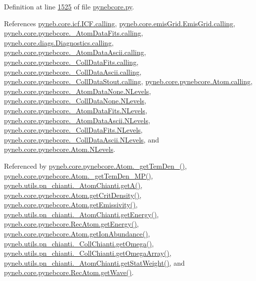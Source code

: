 Definition at line \hyperlink{pynebcore_8py_source_l01525}{1525} of file \hyperlink{pynebcore_8py_source}{pynebcore.\-py}.



References \hyperlink{icf_8py_source_l00016}{pyneb.\-core.\-icf.\-I\-C\-F.\-calling}, \hyperlink{emis_grid_8py_source_l00044}{pyneb.\-core.\-emis\-Grid.\-Emis\-Grid.\-calling}, \hyperlink{pynebcore_8py_source_l00097}{pyneb.\-core.\-pynebcore.\-\_\-\-Atom\-Data\-Fits.\-calling}, \hyperlink{diags_8py_source_l00169}{pyneb.\-core.\-diags.\-Diagnostics.\-calling}, \hyperlink{pynebcore_8py_source_l00318}{pyneb.\-core.\-pynebcore.\-\_\-\-Atom\-Data\-Ascii.\-calling}, \hyperlink{pynebcore_8py_source_l00585}{pyneb.\-core.\-pynebcore.\-\_\-\-Coll\-Data\-Fits.\-calling}, \hyperlink{pynebcore_8py_source_l00936}{pyneb.\-core.\-pynebcore.\-\_\-\-Coll\-Data\-Ascii.\-calling}, \hyperlink{pynebcore_8py_source_l01156}{pyneb.\-core.\-pynebcore.\-\_\-\-Coll\-Data\-Stout.\-calling}, \hyperlink{pynebcore_8py_source_l01229}{pyneb.\-core.\-pynebcore.\-Atom.\-calling}, \hyperlink{pynebcore_8py_source_l00069}{pyneb.\-core.\-pynebcore.\-\_\-\-Atom\-Data\-None.\-N\-Levels}, \hyperlink{pynebcore_8py_source_l00082}{pyneb.\-core.\-pynebcore.\-\_\-\-Coll\-Data\-None.\-N\-Levels}, \hyperlink{pynebcore_8py_source_l00098}{pyneb.\-core.\-pynebcore.\-\_\-\-Atom\-Data\-Fits.\-N\-Levels}, \hyperlink{pynebcore_8py_source_l00319}{pyneb.\-core.\-pynebcore.\-\_\-\-Atom\-Data\-Ascii.\-N\-Levels}, \hyperlink{pynebcore_8py_source_l00586}{pyneb.\-core.\-pynebcore.\-\_\-\-Coll\-Data\-Fits.\-N\-Levels}, \hyperlink{pynebcore_8py_source_l00933}{pyneb.\-core.\-pynebcore.\-\_\-\-Coll\-Data\-Ascii.\-N\-Levels}, and \hyperlink{pynebcore_8py_source_l01231}{pyneb.\-core.\-pynebcore.\-Atom.\-N\-Levels}.



Referenced by \hyperlink{pynebcore_8py_source_l01869}{pyneb.\-core.\-pynebcore.\-Atom.\-\_\-get\-Tem\-Den\-\_()}, \hyperlink{pynebcore_8py_source_l02046}{pyneb.\-core.\-pynebcore.\-Atom.\-\_\-get\-Tem\-Den\-\_\-\-M\-P()}, \hyperlink{pn__chianti_8py_source_l00316}{pyneb.\-utils.\-pn\-\_\-chianti.\-\_\-\-Atom\-Chianti.\-get\-A()}, \hyperlink{pynebcore_8py_source_l01759}{pyneb.\-core.\-pynebcore.\-Atom.\-get\-Crit\-Density()}, \hyperlink{pynebcore_8py_source_l01782}{pyneb.\-core.\-pynebcore.\-Atom.\-get\-Emissivity()}, \hyperlink{pn__chianti_8py_source_l00366}{pyneb.\-utils.\-pn\-\_\-chianti.\-\_\-\-Atom\-Chianti.\-get\-Energy()}, \hyperlink{pynebcore_8py_source_l02927}{pyneb.\-core.\-pynebcore.\-Rec\-Atom.\-get\-Energy()}, \hyperlink{pynebcore_8py_source_l02176}{pyneb.\-core.\-pynebcore.\-Atom.\-get\-Ion\-Abundance()}, \hyperlink{pn__chianti_8py_source_l00507}{pyneb.\-utils.\-pn\-\_\-chianti.\-\_\-\-Coll\-Chianti.\-get\-Omega()}, \hyperlink{pn__chianti_8py_source_l00484}{pyneb.\-utils.\-pn\-\_\-chianti.\-\_\-\-Coll\-Chianti.\-get\-Omega\-Array()}, \hyperlink{pn__chianti_8py_source_l00343}{pyneb.\-utils.\-pn\-\_\-chianti.\-\_\-\-Atom\-Chianti.\-get\-Stat\-Weight()}, and \hyperlink{pynebcore_8py_source_l02699}{pyneb.\-core.\-pynebcore.\-Rec\-Atom.\-get\-Wave()}.


